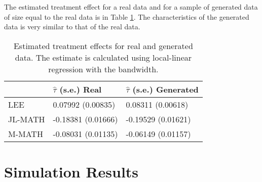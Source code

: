 \documentclass[12pt]{article}
\theoremstyle{definition}
\begin{document}
The estimated treatment effect for a real data and for a sample of generated data of size equal to the real data is in Table \ref{tab:tesample}. The characteristics of the generated data is very similar to that of the real data. 
\begin{table} [ht] 
\centering  
\begin{tabular}{lll}
\toprule
  & $\hat \tau$ (s.e.) Real & $\hat \tau$ (s.e.) Generated\\
\midrule
LEE  & 0.07992 (0.00835) & 0.08311 (0.00618)\\
 JL-MATH & -0.18381 (0.01666) & -0.19529 (0.01621)\\
M-MATH  & -0.08031 (0.01135) & -0.06149 (0.01157)\\
\bottomrule
\end{tabular}
\label{tab:tesample} 
\caption{Estimated treatment effects for real and generated data. The estimate is calculated using local-linear regression with the \citet{imbens2012optimal} bandwidth.} 
\end{table} 

\section{Simulation Results} 
\end{document}
